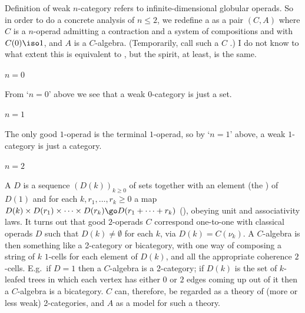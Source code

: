 
Definition  of weak $n$-category refers to
infinite-dimensional globular operads.  So in order to do a concrete analysis
of $n\leq 2$, we redefine a  as a pair $(C,A)$ where
$C$ is a $n$-operad admitting a contraction and a system of compositions and
with $C(0) \iso 1$, and $A$ is a $C$-algebra.  (Temporarily, call such a $C$
.)  I do not know to what extent this is equivalent to ,
but the spirit, at least, is the same.


\paragraph{$n=0$} 

From `$n=0$' above we see that a weak $0$-category is just a set.


\paragraph{$n=1$}

The only good $1$-operad is the terminal $1$-operad, so by `$n=1$' above, a
weak $1$-category is just a category.


\paragraph{$n=2$}

A  $D$ is a sequence $(D(k))_{k\geq
0}$ of sets together with an element (the ) of $D(1)$ and for
each $k, r_1, \ldots, r_k \geq 0$ a map $ D(k) \times D(r_1) \times \cdots
\times D(r_k) \go D(r_1 + \cdots + r_k) $ (), obeying unit
and associativity laws.  It turns out that good $2$-operads $C$ correspond
one-to-one with classical operads $D$ such that $D(k) \neq \emptyset$ for
each $k$, via $D(k) = C(\nu_k)$.  A $C$-algebra is then something like a
2-category or bicategory, with one way of composing a string of $k$ $1$-cells
for each element of $D(k)$, and all the appropriate coherence $2$-cells.
E.g.\ if $D=1$ then a $C$-algebra is a 2-category; if $D(k)$ is the set of
$k$-leafed trees in which each vertex has either $0$ or $2$ edges coming up
out of it then a $C$-algebra is a bicategory.  $C$ can, therefore, be
regarded as a theory of (more or less weak) 2-categories, and $A$ as a model
for such a theory.

